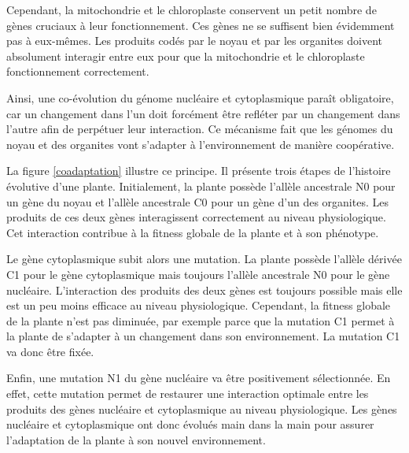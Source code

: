 \documentclass[a4paper]{article}
\begin{document}
Cependant, la mitochondrie et le chloroplaste conservent un petit nombre de gènes cruciaux à leur fonctionnement. Ces gènes ne se suffisent bien évidemment pas à eux-mêmes. Les produits codés par le noyau et par les organites doivent absolument interagir entre eux pour que la mitochondrie et le chloroplaste fonctionnement correctement. 

Ainsi, une co-évolution du génome nucléaire et cytoplasmique paraît obligatoire, car un changement dans l'un doit forcément être refléter par un changement dans l'autre afin de perpétuer leur interaction. Ce mécanisme fait que les génomes du noyau et des organites vont s'adapter à l'environnement de manière coopérative.

La figure \ref{coadaptation} illustre ce principe. Il présente trois étapes de l'histoire évolutive d'une plante. Initialement, la plante possède l'allèle ancestrale N0 pour un gène du noyau et l'allèle ancestrale C0 pour un gène d'un des organites. Les produits de ces deux gènes interagissent correctement au niveau physiologique. Cet interaction contribue à la fitness globale de la plante et à son phénotype.

Le gène cytoplasmique subit alors une mutation. La plante possède l'allèle dérivée C1 pour le gène cytoplasmique mais toujours l'allèle ancestrale N0 pour le gène nucléaire. L'interaction des produits des deux gènes est toujours possible mais elle est un peu moins efficace au niveau physiologique. Cependant, la fitness globale de la plante n'est pas diminuée, par exemple parce que la mutation C1 permet à la plante de s'adapter à un changement dans son environnement. La mutation C1 va donc être fixée. 

Enfin, une mutation N1 du gène nucléaire va être positivement sélectionnée. En effet, cette mutation permet de restaurer une interaction optimale entre les produits des gènes nucléaire et cytoplasmique au niveau physiologique. Les gènes nucléaire et cytoplasmique ont donc évolués main dans la main pour assurer l'adaptation de la plante à son nouvel environnement. 
\end{document}
